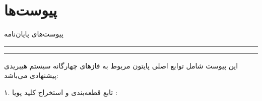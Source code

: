 \clearpage\chapter*{پیوست‌ها}
پیوست‌های پایان‌نامه \par



\par\medskip\hrule\medskip

\clearpage{}

\par\medskip\hrule\medskip



این پیوست شامل توابع اصلی پایتون مربوط به فازهای چهارگانه سیستم هیبریدی پیشنهادی می‌باشد:\par



۱. تابع قطعه‌بندی  و استخراج کلید پویا :\par

